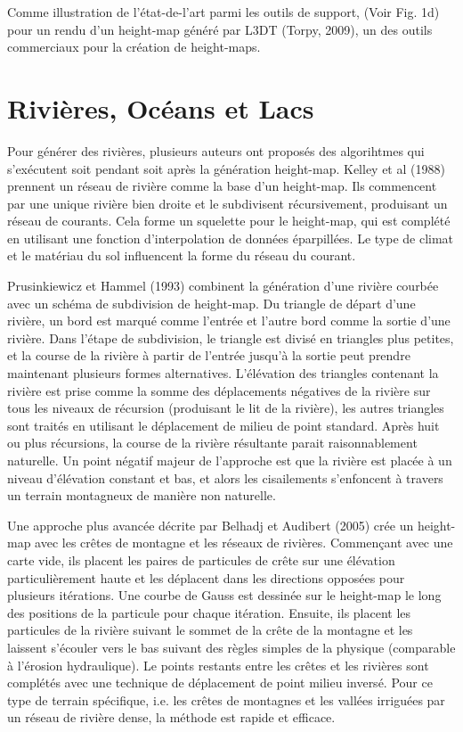 \documentclass[11pt]{report}
\begin{document}
Comme illustration de l'état-de-l'art parmi les outils de support, (Voir Fig. 1d) pour un rendu d'un height-map généré par L3DT (Torpy, 2009), un des outils commerciaux pour la création de height-maps.

\section{Rivières, Océans et Lacs}

Pour générer des rivières, plusieurs auteurs ont proposés des algorihtmes qui s'exécutent soit pendant soit après la génération height-map. Kelley et al (1988) \cite{kelley-88} prennent un réseau de rivière comme la base d'un height-map. Ils commencent par une unique rivière bien droite et le subdivisent récursivement, produisant un réseau de courants. Cela forme un squelette pour le height-map, qui est complété en utilisant une fonction d'interpolation de données éparpillées. Le type de climat et le matériau du sol influencent la forme du réseau du courant. \newline

Prusinkiewicz et Hammel (1993) combinent la génération d'une rivière courbée avec un schéma de subdivision de height-map. Du triangle de départ d'une rivière, un bord est marqué comme l'entrée et l'autre bord comme la sortie d'une rivière. Dans l'étape de subdivision, le triangle est divisé en triangles plus petites, et la course de la rivière à partir de l'entrée jusqu'à la sortie peut prendre maintenant plusieurs formes alternatives. L'élévation des triangles contenant la rivière est prise comme la somme des déplacements négatives de la rivière sur tous les niveaux de récursion (produisant le lit de la rivière), les autres triangles sont traités en utilisant le déplacement de milieu de point standard. Après huit ou plus récursions, la course de la rivière résultante parait raisonnablement naturelle. Un point négatif majeur de l'approche est que la rivière est placée à un niveau d'élévation constant et bas, et alors les cisailements s'enfoncent à travers un terrain montagneux de manière non naturelle. \newline

Une approche plus avancée décrite par Belhadj et Audibert (2005) crée un height-map avec les crêtes de montagne et les réseaux de rivières. Commençant avec une carte vide, ils placent les paires de particules de crête sur une élévation particulièrement haute et les déplacent dans les directions opposées pour plusieurs itérations. Une courbe de Gauss est dessinée sur le height-map le long des positions de la particule pour chaque itération. Ensuite, ils placent les particules de la rivière suivant le sommet de la crête de la montagne et les laissent s'écouler vers le bas suivant des règles simples de la physique (comparable à l'érosion hydraulique). Le points restants entre les crêtes et les rivières sont complétés avec une technique de déplacement de point milieu inversé. Pour ce type de terrain spécifique, i.e. les crêtes de montagnes et les vallées irriguées par un réseau de rivière dense, la méthode est rapide et efficace. \newline
 
\end{document}
